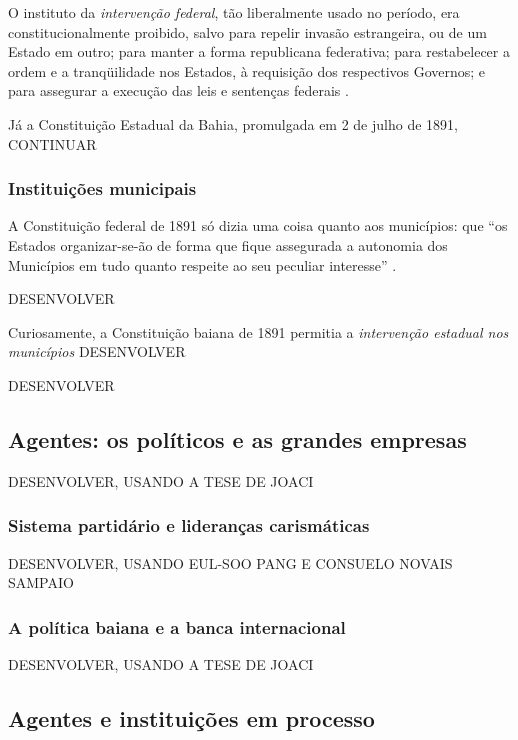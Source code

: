 O instituto da \textit{intervenção federal}, tão liberalmente usado no período, era constitucionalmente proibido, salvo para repelir invasão estrangeira, ou de um Estado em outro; para manter a forma republicana federativa; para restabelecer a ordem e a tranqüilidade nos Estados, à requisição dos respectivos Governos; e para assegurar a execução das leis e sentenças federais \cite[art.~6º,~nº~1~a~4]{brasil_constituicao_1891}.

Já a Constituição Estadual da Bahia, promulgada em 2 de julho de 1891, CONTINUAR

\subsubsection{Instituições municipais}

A Constituição federal de 1891 só dizia uma coisa quanto aos municípios: que ``os Estados organizar-se-ão de forma que fique assegurada a autonomia dos Municípios em tudo quanto respeite ao seu peculiar interesse'' \cite[art.~68]{brasil_constituicao_1891}.

DESENVOLVER

Curiosamente, a Constituição baiana de 1891 permitia a \textit{intervenção estadual nos municípios} DESENVOLVER

DESENVOLVER

\subsection{Agentes: os políticos e as grandes empresas}

DESENVOLVER, USANDO A TESE DE JOACI

\subsubsection{Sistema partidário e lideranças carismáticas}

DESENVOLVER, USANDO EUL-SOO PANG E CONSUELO NOVAIS SAMPAIO

\subsubsection{A política baiana e a banca internacional}

DESENVOLVER, USANDO A TESE DE JOACI

\subsection{Agentes e instituições em processo}

